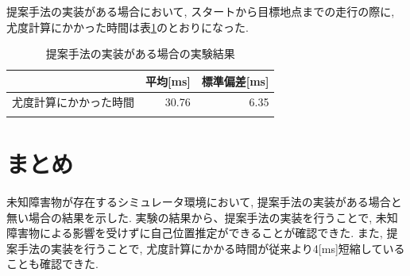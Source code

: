 提案手法の実装がある場合において, スタートから目標地点までの走行の際に, 
尤度計算にかかった時間は表\ref{tabule:likelihood_calc_time_sim_imp}のとおりになった. 

\begin{table}[ht]
  \begin{center}
    \caption{提案手法の実装がある場合の実験結果}
    \label{tabule:likelihood_calc_time_sim_imp}
    \begin{tabular}{l|r|r} 
      \thline
      & 平均[ms] &  標準偏差[ms] \\
      \hline
      尤度計算にかかった時間 & 30.76 & 6.35 \\
      \thline
    \end{tabular}
  \end{center}
\end{table}

\section{まとめ}
未知障害物が存在するシミュレータ環境において, 提案手法の実装がある場合と無い場合の結果を示した. 
実験の結果から、提案手法の実装を行うことで, 未知障害物による影響を受けずに自己位置推定ができることが確認できた. 
また, 提案手法の実装を行うことで, 尤度計算にかかる時間が従来より4[ms]短縮していることも確認できた. 